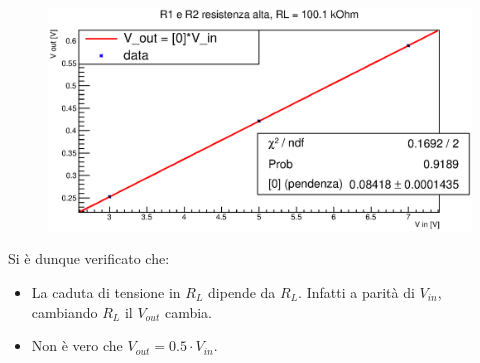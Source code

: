     \begin{figure}[H]
    \centering
    \includegraphics[scale=.7]{Grafici/C1_P2_partResHigh3.eps}
    \end{figure}
    Si è dunque verificato che:
    \begin{itemize}
        \item La caduta di tensione in $R_L$  dipende da $R_L$. Infatti a parità di $V_{in}$, cambiando $R_L$ il $V_{out}$ cambia.
        \item Non è vero che $V_{out} = 0.5 \cdot V_{in}$.
    \end{itemize}
%    
